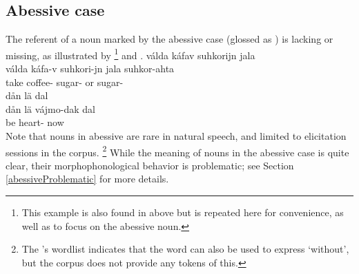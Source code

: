 \subsection{Abessive case}\label{abessive}%
The referent of a noun marked by the abessive case (glossed as \ABESSs) is lacking or missing, as illustrated by \footnote{This example is also found in  above but is repeated here for convenience, as well as to focus on the abessive noun.} 
and . 
\ea\label{abess1}
\glll	válda káfav suhkorijn jala \\
	válda káfa-v suhkori-jn jala suhkor-ahta\\
	take\BS{} coffee- sugar- or sugar-\\\nopagebreak
{} 
\z
%
\ea\label{abess2}
\glll	dån lä  dal\\
	dån lä vájmo-dak dal\\
	 be\BS{} heart- now\\\nopagebreak
{} 
\z
Note that nouns in abessive are rare in natural speech, and limited to elicitation sessions in the corpus.%
\footnote{The \WLP’s wordlist indicates that the word  can also be used to express ‘without’, but the corpus does not provide any tokens of this.} 
While the meaning of nouns in the abessive case is quite clear, their morphophonological behavior is problematic; see Section \ref{abessiveProblematic} for more details.


